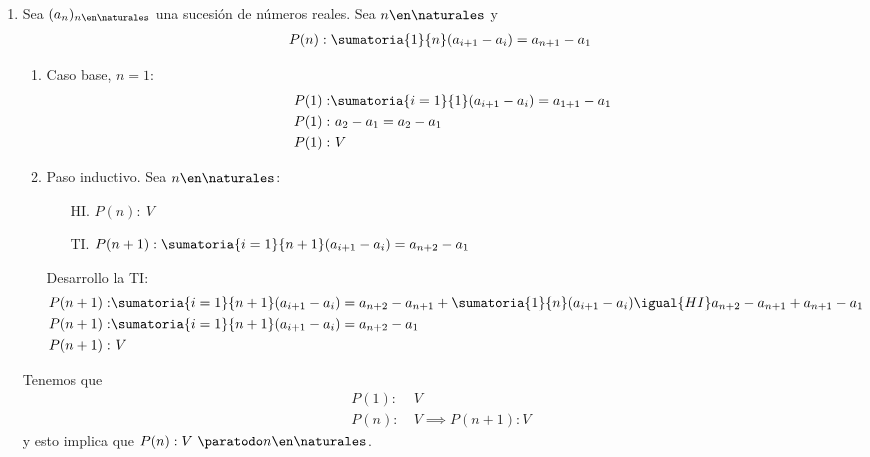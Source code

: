\begin{enumerate}[label=\roman*)]

  \item Sea $(a_n)_{n \en \naturales }$ una sucesión de números reales. Sea $n \en \naturales $ y
        \begin{align*}
          P(n): \sumatoria{1}{n} (a_{i+1} - a_i) = a_{n+1} - a_1
        \end{align*}
        \begin{enumerate}[label=\arabic*)]

          \item Caso base, $ n = 1$:
                \begin{align*}
                  P(1): & \sumatoria{i = 1}{1} (a_{i+1} - a_i) = a_{1+1} - a_1 \\
                  P(1): & \ a_2 - a_1 = a_2 - a_1                              \\
                  P(1): & \ V
                \end{align*}

          \item Paso inductivo. Sea $n \en \naturales $:
                \begin{enumerate}
                  \item[HI.] $P(n): \ V$
                  \item[TI.] $ P(n+1):  \sumatoria{i=1}{n+1} (a_{i+1} - a_i) = a_{n+2} - a_1 $
                \end{enumerate}
                Desarrollo la TI:
                \begin{align*}
                  P(n+1): & \sumatoria{i=1}{n+1} (a_{i+1} - a_i) =
                  a_{n+2} - a_{n+1} + \sumatoria{1}{n} (a_{i+1} - a_i) \igual{HI} a_{n+2} - a_{n+1} + a_{n+1} - a_1 \\
                  P(n+1): & \sumatoria{i=1}{n+1}(a_{i+1} - a_i) = a_{n+2} - a_1                                     \\
                  P(n+1): & \ V
                \end{align*}
        \end{enumerate}

        Tenemos que
        \begin{align*}
          P(1): & \ V                   \\
          P(n): & \ V \implies P(n+1):V
        \end{align*}
        y esto implica que $P(n): V \ \paratodo n \en \naturales $.


\end{enumerate}

